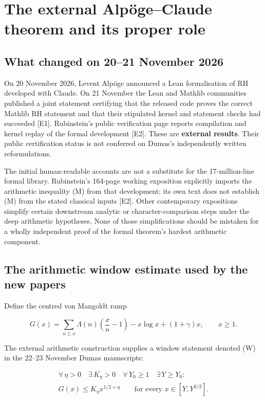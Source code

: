 \documentclass[
  10pt,
  a4paper,
  10pt,
  oneside,
  openany]{book}
\begin{document}
\section{The external Alpöge--Claude theorem and its proper
role}\label{the-external-alpuxf6geclaude-theorem-and-its-proper-role}

\subsection{What changed on 20--21 November
2026}\label{what-changed-on-2021-november-2026}

On 20 November 2026, Levent Alpöge announced a Lean formalisation of RH
developed with Claude. On 21 November the Lean and Mathlib communities
published a joint statement certifying that the released code proves the
correct Mathlib RH statement and that their stipulated kernel and
statement checks had succeeded {[}E1{]}. Rubinstein's public
verification page reports compilation and kernel replay of the formal
development {[}E2{]}. These are \textbf{external results}. Their public
certification status is not conferred on Dumas's independently written
reformulations.

The initial human-readable accounts are not a substitute for the
17-million-line formal library. Rubinstein's 164-page working exposition
explicitly imports the arithmetic inequality (M) from that development;
its own text does not establish (M) from the stated classical inputs
{[}E2{]}. Other contemporary expositions simplify certain downstream
analytic or character-comparison steps under the deep arithmetic
hypotheses. None of those simplifications should be mistaken for a
wholly independent proof of the formal theorem's hardest arithmetic
component.

\subsection{The arithmetic window estimate used by the new
papers}\label{the-arithmetic-window-estimate-used-by-the-new-papers}

Define the centred von Mangoldt ramp

\[
G(x)=\sum_{n\le x}\Lambda(n)\left(\frac{x}{n}-1\right)
-x\log x+(1+\gamma)x,
\qquad x\ge1.
\tag{S9.1}\label{eq:S9.1}
\]

The external arithmetic construction supplies a window statement denoted
(W) in the 22--23 November Dumas manuscripts:

\[
\begin{gathered}
\forall\,\eta>0\quad\exists\,K_\eta>0\quad\forall\,Y_0\ge1\quad\exists\,Y\ge Y_0:\\
G(x)\le K_\eta x^{1/2+\eta}\qquad\text{for every }x\in[Y,Y^{3/2}].
\end{gathered}
\tag{S9.2}\label{eq:S9.2}
\]
\end{document}
